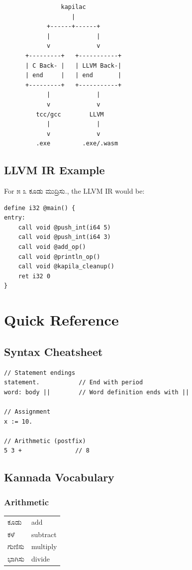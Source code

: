 \documentclass[11pt,a4paper]{report}
\newcommand{\kannada}[1]{{\kannadafont #1}}
\begin{document}
\begin{verbatim}
                kapilac
                   |
            +------+------+
            |             |
            v             v
      +---------+   +-----------+
      | C Back- |   | LLVM Back-|
      | end     |   | end       |
      +---------+   +-----------+
            |             |
            v             v
         tcc/gcc        LLVM
            |             |
            v             v
         .exe         .exe/.wasm
\end{verbatim}

\section{LLVM IR Example}

For \kannada{೫ ೩ ಕೂಡು ಮುದ್ರಿಸು.}, the LLVM IR would be:

\begin{lstlisting}
define i32 @main() {
entry:
    call void @push_int(i64 5)
    call void @push_int(i64 3)
    call void @add_op()
    call void @println_op()
    call void @kapila_cleanup()
    ret i32 0
}
\end{lstlisting}

\chapter{Quick Reference}

\section{Syntax Cheatsheet}

\begin{lstlisting}
// Statement endings
statement.           // End with period
word: body ||        // Word definition ends with ||

// Assignment
x := 10.

// Arithmetic (postfix)
5 3 +               // 8
\end{lstlisting}

\section{Kannada Vocabulary}

\subsection{Arithmetic}
\begin{tabular}{ll}
\kannada{ಕೂಡು} & add \\
\kannada{ಕಳೆ} & subtract \\
\kannada{ಗುಣಿಸು} & multiply \\
\kannada{ಭಾಗಿಸು} & divide \\
\end{tabular}
\end{document}
